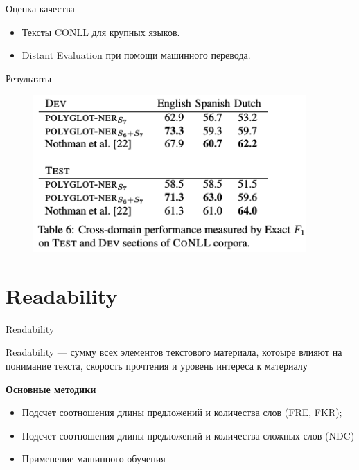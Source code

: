 \documentclass{beamer}
\begin{document}
\begin{frame}{Оценка качества}
\begin{itemize}
\item Тексты CONLL для крупных языков.
\item Distant Evaluation при помощи машинного перевода. 
\end{itemize}
\end{frame}

\begin{frame}{Результаты}
\begin{figure}
\includegraphics[height=6cm]{ner_conll_test.png}
\end{figure}
\end{frame}

\section{Readability}
\begin{frame}{Readability}

Readability — сумму всех элементов текстового материала, котоыре влияют на понимание текста, скорость прочтения и уровень интереса к материалу

\textbf{Основные методики}
\begin{itemize}
\item Подсчет соотношения длины предложений и количества слов (FRE, FKR);
\item Подсчет соотношения длины предложений и количества сложных слов (NDC)
\item Применение машинного обучения
\end{itemize}

\end{frame}
\end{document}
